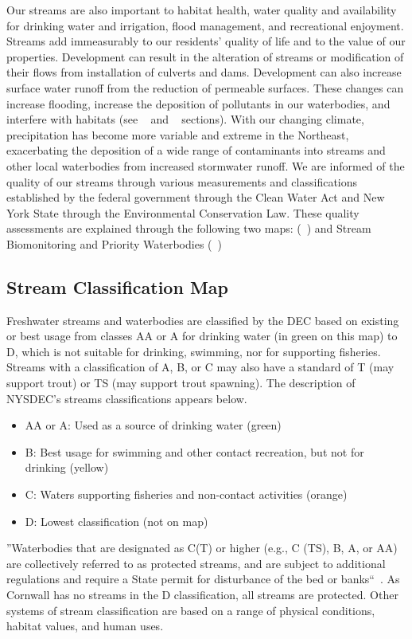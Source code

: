 Our streams are also important to habitat health, water quality and 
availability for drinking water and irrigation, flood management, and 
recreational enjoyment. Streams add immeasurably to our residents’ quality of 
life and to the value of our properties. Development can result in the 
alteration of streams or modification of their flows from installation of 
culverts and dams. Development can also increase surface water runoff from the 
reduction of permeable surfaces. These changes can increase flooding, increase 
the deposition of pollutants in our waterbodies, and interfere with habitats 
(see ~ and 
~ sections). With our changing climate, 
precipitation has become more variable and extreme in the Northeast, 
exacerbating the deposition of a wide range of contaminants into streams and 
other local waterbodies from increased stormwater runoff.
We are informed of the quality of our streams through various measurements and 
classifications established by the federal government through the Clean Water 
Act and New York State through the Environmental Conservation Law. These 
quality assessments are explained through the following two maps: 
(~) and Stream Biomonitoring and 
Priority Waterbodies (~)

\subsection*{Stream Classification Map}
Freshwater streams and waterbodies are classified by the DEC based on existing 
or best usage from classes AA or A for drinking water (in green on this map) to 
D, which is not suitable for drinking, swimming, nor for supporting fisheries. 
Streams with a classification of A, B, or C may also have a standard of T (may 
support trout) or TS (may support trout spawning). The description of NYSDEC’s 
streams classifications appears below.
\begin{itemize}
    \item AA or A: Used as a source of drinking water (green)
    \item B: Best usage for swimming and other contact recreation, but not for
        drinking (yellow)
    \item C: Waters supporting fisheries and non-contact activities (orange)
    \item D: Lowest classification (not on map)
\end{itemize}
''Waterbodies that are designated as C(T) or higher (e.g., C (TS), B, A, or AA) 
are collectively referred to as protected streams, and are subject to 
additional regulations and require a State permit for disturbance of the bed or 
banks``~\citep{haeckel2014}. As Cornwall has no streams in the D 
classification, all streams are protected. Other systems of stream 
classification are based on a range of physical conditions, habitat values, and 
human uses.

